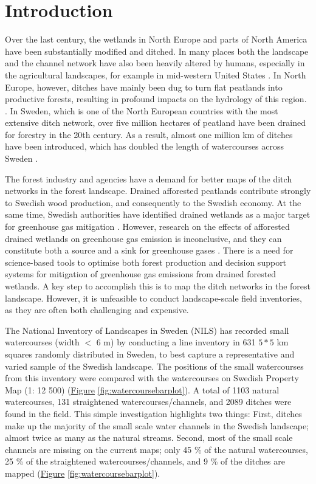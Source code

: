 \documentclass[11pt, review]{elsarticle} %
\begin{document}
\newpage
\section{Introduction}\label{introduction}

Over the last century, the wetlands in North Europe and parts of North America have been substantially modified and ditched. In many places both the landscape and the channel network have also been heavily altered  by humans, especially in the agricultural landscapes, for example in mid-western United States \citep{passalacqua}. In North Europe, however, ditches have mainly been dug to turn flat peatlands into productive forests, resulting in profound impacts on the hydrology of this region. \citep{peatlands}. In Sweden, which is one of the North European countries with the most extensive ditch network, over five million hectares of peatland have been drained for forestry in the 20th century.  As a result, almost one million km of ditches have been introduced, which has doubled the length of watercourses across Sweden  \citep{hasselquist}.

The forest industry and agencies have a demand for better maps of the ditch networks in the forest landscape. Drained afforested peatlands contribute strongly to Swedish wood production, and consequently to the Swedish economy. At the same time, Swedish authorities have identified drained wetlands as a major target for greenhouse gas mitigation \citep{greenhouse_skogsstyrelsen, greenhouse_jordbruksverket}. However, research on the effects of afforested drained wetlands on greenhouse gas emission is inconclusive, and they can constitute both a source and a sink for greenhouse gases \citep{greenhouse_yes, greenhouse_no}. There is a need for science-based tools to optimise both forest production and decision support systems for mitigation of greenhouse gas emissions from drained forested wetlands. A key step to accomplish this is to map the ditch networks in the forest landscape. However, it is unfeasible to conduct landscape-scale field inventories, as they are often both challenging and expensive.

The National Inventory of Landscapes in Sweden (NILS) has recorded small watercourses (width $<$ 6 m) by conducting a line inventory in 631 $5*5$ km squares randomly distributed in Sweden, to best capture a representative and varied sample of the Swedish landscape. The positions of the small watercourses from this inventory were compared with the watercourses on Swedish Property Map (1: 12 500) (\hyperref[fig:watercoursebarplot]{Figure} \ref{fig:watercoursebarplot}). A total of 1103 natural watercourses, 131 straightened watercourses/channels, and 2089 ditches were found in the field. This simple investigation highlights two things: First, ditches make up the majority of the small scale water channels in the Swedish landscape; almost twice as many as the natural streams. Second, most of the small scale channels are missing on the current maps; only 45 \% of the natural watercourses, 25 \% of the straightened watercourses/channels, and 9 \% of the ditches are mapped (\hyperref[fig:watercoursebarplot]{Figure} \ref{fig:watercoursebarplot}).
\end{document}
